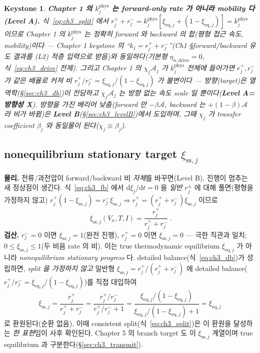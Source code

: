 \documentclass[11pt,a4paper]{article}
\newtheorem*{keybox}{Keystone}
\newcommand{\dd}{\mathrm{d}}
\newcommand{\eq}{\mathrm{eq}}
\newcommand{\drive}{\mathrm{drive}}
\newcommand{\sstat}{\mathrm{ss}}
\begin{document}
\begin{keybox}
\textbf{Chapter 1 의 $k_j^{\mathrm{phys}}$ 는 forward-only rate 가 아니라 mobility 다 (Level A).} 식~\eqref{eq:ch3_split}
에서 $r_j^++r_j^-=k_j^{\mathrm{phys}}[\xi_{\eq,j}+(1-\xi_{\eq,j})]=k_j^{\mathrm{phys}}$ 이므로 Chapter 1 의
$k_j^{\mathrm{phys}}$ 는 정확히 \emph{forward 와 backward 의 합}(평형 접근 속도, mobility)이다 — Chapter 1
keystone 의 ``$k_j=r_j^++r_j^-$''(Ch1 §forward/backward 유도 결과를 (L2) 적층 입력으로 받음)와 동일하다(기본형
$\eta_{n,\drive}=0$, 식~\eqref{eq:ch3_drive} 전제). 그리고 Chapter 1 의 $\chi_j\mathcal A_j$
가 $k_j^{\mathrm{phys}}$ \emph{전체}에 들어가면 $r_j^+,r_j^-$ 가 \emph{같은 배율}로 커져 비
$r_j^+/r_j^-=\xi_{\eq,j}/(1-\xi_{\eq,j})$ 가 \emph{불변}이다 — 방향(target)은 열역학(\S\ref{sec:ch3_db})이
전담하고 $\chi_j\mathcal A_j$ 는 \emph{방향 없는} 속도 scale 일 뿐이다(\textbf{Level A=방향성 X}). \emph{방향을
가진} 배리어 낮춤(forward 만 $-\beta\mathcal A$, backward 는 $+(1-\beta)\mathcal A$ 라 비가 바뀜)은
\textbf{Level B}(\S\ref{sec:ch3_levelB})에서 도입하며, 그때 $\chi_j$ 가 transfer coefficient $\beta_j$ 와
\emph{동일물}이 된다($\chi_j\equiv\beta_j$).
\end{keybox}

\subsection{nonequilibrium stationary target $\xi_{\sstat,j}$}\label{sec:ch3_xiss}
\textbf{물리.} 전류/과전압이 forward/backward 비 \emph{자체}를 바꾸면(Level B), 진행이 멈추는 새 정상점이
생긴다. 식~\eqref{eq:ch3_fb} 에서 $\dd\xi_j/\dd t=0$ 을 \emph{일반} $r_j^\pm$ 에 대해 풀면(평형을 가정하지 않고)
$r_j^+(1-\xi_{\sstat,j})=r_j^-\xi_{\sstat,j}\Rightarrow r_j^+=(r_j^++r_j^-)\xi_{\sstat,j}$ 이므로
\begin{equation}
\boxed{\;\xi_{\sstat,j}(V_n,T,I)=\frac{r_j^+}{r_j^++r_j^-}\;.}
\label{eq:ch3_xiss}
\end{equation}
\textbf{검산.} $r_j^-=0$ 이면 $\xi_{\sstat,j}=1$(완전 진행), $r_j^+=0$ 이면 $\xi_{\sstat,j}=0$ — 극한 직관과 일치;
$0\le\xi_{\sstat,j}\le1$(두 비음 rate 의 비). 이는 true thermodynamic equilibrium $\xi_{\eq,j}$ 가 아니라
\emph{nonequilibrium stationary progress} 다. detailed balance(식~\eqref{eq:ch3_db})가 성립하면, \emph{split 을
가정하지 않고} 일반형 $\xi_{\sstat,j}=r_j^+/(r_j^++r_j^-)$ 에 detailed balance($r_j^+/r_j^-=\xi_{\eq,j}/(1-\xi_{\eq,j})$)를
직접 대입하여
\begin{equation*}
\xi_{\sstat,j}=\frac{r_j^+}{r_j^++r_j^-}=\frac{r_j^+/r_j^-}{r_j^+/r_j^-+1}
=\frac{\xi_{\eq,j}/(1-\xi_{\eq,j})}{\xi_{\eq,j}/(1-\xi_{\eq,j})+1}=\xi_{\eq,j}
\end{equation*}
로 환원된다(순환 없음). 이때 consistent split(식~\eqref{eq:ch3_split})은 이 환원을 달성하는 \emph{한 표현}임이
사후 확인된다. Chapter 5
의 branch target 도 이 $\xi_{\sstat,j}$ 계열이며 true equilibrium 과 구분한다(\S\ref{sec:ch3_transmit}).
\end{document}
